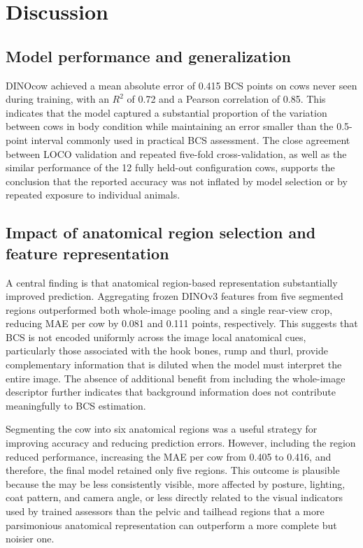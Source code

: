 \section{Discussion}
\label{sec:discussion}

\subsection{Model performance and generalization}

DINOcow achieved a mean absolute error of 0.415 BCS points on cows never seen during training, with an $R^2$ of 0.72 and a Pearson correlation of 0.85.
This indicates that the model captured a substantial proportion of the variation between cows in body condition while maintaining an error smaller than the 0.5-point interval commonly used in practical BCS assessment.
The close agreement between LOCO validation and repeated five-fold cross-validation, as well as the similar performance of the 12 fully held-out configuration cows, supports the conclusion that the reported accuracy was not inflated by model selection or by repeated exposure to individual animals.

\subsection{Impact of anatomical region selection and feature representation}

A central finding is that anatomical region-based representation substantially improved prediction.
Aggregating frozen DINOv3 features from five  segmented regions outperformed both whole-image pooling and a single rear-view crop, reducing MAE per cow by 0.081 and 0.111 points, respectively.
This suggests that BCS is not encoded uniformly across the image local anatomical cues, particularly those associated with the hook bones, rump and thurl, provide complementary information that is diluted when the model must interpret the entire image.
The absence of additional benefit from including the whole-image descriptor further indicates that background information does not contribute meaningfully to BCS estimation.

Segmenting the cow into six anatomical regions was a useful strategy for improving accuracy and reducing prediction errors.
However, including the  region reduced performance, increasing the MAE per cow from 0.405 to 0.416, and therefore, the final model retained only five regions.
This outcome is plausible because the  may be less consistently visible, more affected by posture, lighting, coat pattern, and camera angle, or less directly related to the visual indicators used by trained assessors than the pelvic and tailhead regions that a more parsimonious anatomical representation can outperform a more complete but noisier one.

